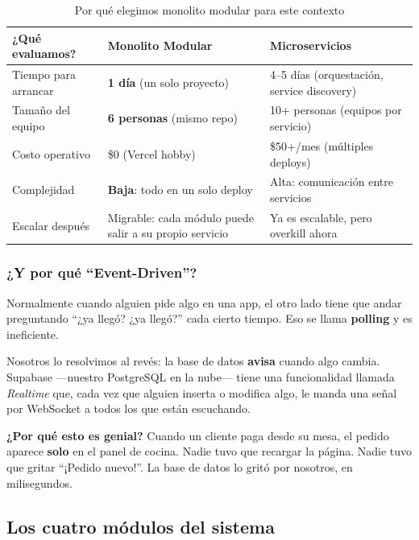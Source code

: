 \documentclass[12pt,a4paper]{article}
\begin{document}
\begin{table}[H]
\centering
{}
\begin{tabular}{p{3cm} p{5.5cm} p{5.5cm}}
\toprule
\rowcolor{thomas!20}\textbf{¿Qué evaluamos?} & \textbf{Monolito Modular} & \textbf{Microservicios} \\
\midrule
Tiempo para arrancar & \textbf{1 día} (un solo proyecto) & 4--5 días (orquestación, service discovery) \\
Tamaño del equipo & \textbf{6 personas} (mismo repo) & 10+ personas (equipos por servicio) \\
Costo operativo & \$0 (Vercel hobby) & \$50+/mes (múltiples deploys) \\
Complejidad & \textbf{Baja}: todo en un solo deploy & Alta: comunicación entre servicios \\
Escalar después & Migrable: cada módulo puede salir a su propio servicio & Ya es escalable, pero overkill ahora \\
\bottomrule
\end{tabular}
\caption{Por qué elegimos monolito modular para este contexto}
\end{table}

\subsubsection{¿Y por qué ``Event-Driven''?}

Normalmente cuando alguien pide algo en una app, el otro lado tiene que andar preguntando ``¿ya llegó? ¿ya llegó?'' cada cierto tiempo. Eso se llama \textbf{polling} y es ineficiente.

Nosotros lo resolvimos al revés: la base de datos \textbf{avisa} cuando algo cambia. Supabase —nuestro PostgreSQL en la nube— tiene una funcionalidad llamada \textit{Realtime} que, cada vez que alguien inserta o modifica algo, le manda una señal por WebSocket a todos los que están escuchando.

\begin{tipbox}
\textbf{¿Por qué esto es genial?} Cuando un cliente paga desde su mesa, el pedido aparece \textbf{solo} en el panel de cocina. Nadie tuvo que recargar la página. Nadie tuvo que gritar ``¡Pedido nuevo!''. La base de datos lo gritó por nosotros, en milisegundos.
\end{tipbox}

\subsection{Los cuatro módulos del sistema}
\end{document}
